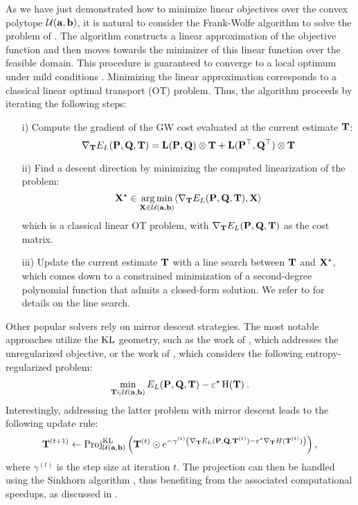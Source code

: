 As we have just demonstrated how to minimize linear objectives over the convex polytope ${\mathcal{U}}({\mathbf{a}}, {\mathbf{b}})$, it is natural to consider the Frank-Wolfe algorithm \citep{frank1956algorithm} to solve the problem of . The algorithm constructs a linear approximation of the objective function and then moves towards the minimizer of this linear function over the feasible domain. This procedure is guaranteed to converge to a local optimum under mild conditions \citep{lacoste2016convergence}. Minimizing the linear approximation corresponds to a classical linear optimal transport (OT) problem. Thus, the algorithm proceeds by iterating the following steps:
\begin{enumerate}
    \item[i)] Compute the gradient of the GW cost evaluated at the current estimate ${\mathbf{T}}$:
    \[
        \nabla_{{\mathbf{T}}} E_L({\mathbf{P}}, {\mathbf{Q}}, {\mathbf{T}}) = {\mathbf{L}}({\mathbf{P}}, {\mathbf{Q}}) \otimes {\mathbf{T}} + {\mathbf{L}}({\mathbf{P}}^\top, {\mathbf{Q}}^\top) \otimes {\mathbf{T}}
    \]
    
    \item[ii)] Find a descent direction by minimizing the computed linearization of the problem:
    \[
    {\mathbf{X}}^\star \in \operatorname*{arg\,min}_{{\mathbf{X}} \in \mathcal{U}({\mathbf{a}}, {\mathbf{b}})} \langle \nabla_{{\mathbf{T}}} E_L({\mathbf{P}}, {\mathbf{Q}}, {\mathbf{T}}), {\mathbf{X}} \rangle
    \]
    which is a classical linear OT problem, with $\nabla_{{\mathbf{T}}} E_L({\mathbf{P}}, {\mathbf{Q}}, {\mathbf{T}})$ as the cost matrix.
    
    \item[iii)] Update the current estimate ${\mathbf{T}}$ with a line search between ${\mathbf{T}}$ and ${\mathbf{X}}^\star$, which comes down to a constrained minimization of a second-degree polynomial function that admits a closed-form solution. We refer to \citep{vayer2020contribution} for details on the line search.
\end{enumerate}

Other popular solvers rely on mirror descent strategies. The most notable approaches utilize the $\operatorname{KL}$ geometry, such as the work of \cite{xu2019gromov}, which addresses the unregularized  objective, or the work of \cite{peyre2016gromov}, which considers the following entropy-regularized problem:
\begin{align}
    \min_{{\mathbf{T}} \in {\mathcal{U}}({\mathbf{a}}, {\mathbf{b}})} E_L({\mathbf{P}}, {\mathbf{Q}}, {\mathbf{T}}) - \varepsilon^\star \operatorname{H}({\mathbf{T}}) \:.
\end{align}
Interestingly, addressing the latter problem with mirror descent leads to the following update rule:
\begin{align}
    {\mathbf{T}}^{(t+1)} \leftarrow \text{Proj}^{\operatorname{KL}}_{{\mathcal{U}}({\mathbf{a}}, {\mathbf{b}})} \left( {\mathbf{T}}^{(t)} \odot e^{-\gamma^{(t)} \left( \nabla_{{\mathbf{T}}} E_L({\mathbf{P}}, {\mathbf{Q}}, {\mathbf{T}}^{(t)}) - \varepsilon^\star \nabla_{{\mathbf{T}}} H({\mathbf{T}}^{(t)}) \right)} \right),
\end{align}
where $\gamma^{(t)}$ is the step size at iteration $t$. The projection can then be handled using the Sinkhorn algorithm \citep{cuturi2013sinkhorn}, thus benefiting from the associated computational speedups, as discussed in .

